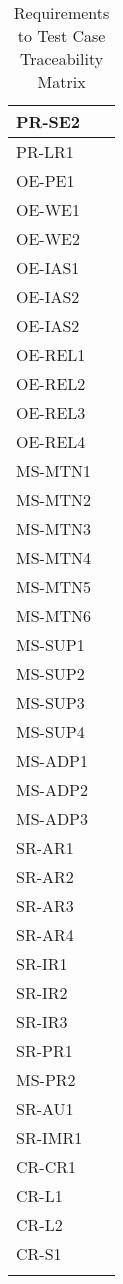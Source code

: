 \documentclass[12pt, titlepage]{article}
\begin{document}
\begin{longtable}{|l|l|}
  PR-SE2 & \\ \hline
  PR-LR1 & \\ \hline
  OE-PE1 & \\ \hline
  OE-WE1 & \\ \hline
  OE-WE2 & \\ \hline
  OE-IAS1 & \\ \hline
  OE-IAS2 & \\ \hline
  OE-IAS2 & \\ \hline
  OE-REL1 & \\ \hline
  OE-REL2 & \\ \hline
  OE-REL3 & \\ \hline
  OE-REL4 & \\ \hline
  MS-MTN1 & \\ \hline
  MS-MTN2 & \\ \hline
  MS-MTN3 & \\ \hline
  MS-MTN4 & \\ \hline
  MS-MTN5 & \\ \hline
  MS-MTN6 & \\ \hline
  MS-SUP1 & \\ \hline
  MS-SUP2 & \\ \hline
  MS-SUP3 & \\ \hline
  MS-SUP4 & \\ \hline
  MS-ADP1 & \\ \hline
  MS-ADP2 & \\ \hline
  MS-ADP3 & \\ \hline
  SR-AR1 & \\ \hline
  SR-AR2 & \\ \hline
  SR-AR3 & \\ \hline
  SR-AR4 & \\ \hline
  SR-IR1 & \\ \hline
  SR-IR2 & \\ \hline
  SR-IR3 & \\ \hline
  SR-PR1 & \\ \hline
  MS-PR2 & \\ \hline
  SR-AU1 & \\ \hline
  SR-IMR1 & \\ \hline
  CR-CR1 & \\ \hline
  CR-L1 & \\ \hline
  CR-L2 & \\ \hline
  CR-S1 & \\ \hline
  \caption{Requirements to Test Case Traceability Matrix}
\end{longtable}
\end{document}

